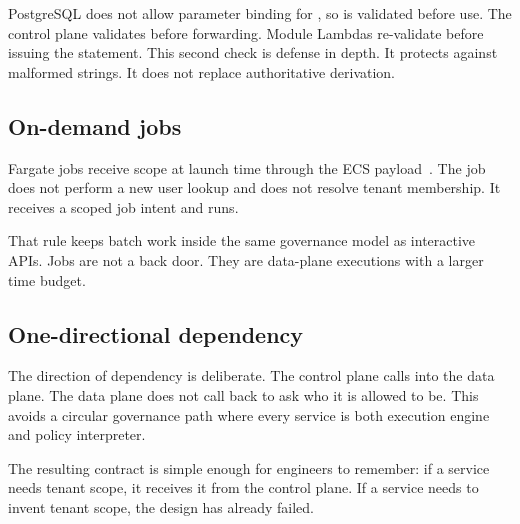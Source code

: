 PostgreSQL does not allow parameter binding for , so \scopeprefix{} is validated before use. The control plane validates before forwarding. Module Lambdas re-validate before issuing the statement. This second check is defense in depth. It protects against malformed strings. It does not replace authoritative derivation.

\subsection{On-demand jobs}

Fargate jobs receive scope at launch time through the ECS  payload~\cite{ecs_runtask}. The job does not perform a new user lookup and does not resolve tenant membership. It receives a scoped job intent and runs.

That rule keeps batch work inside the same governance model as interactive APIs. Jobs are not a back door. They are data-plane executions with a larger time budget.

\subsection{One-directional dependency}

The direction of dependency is deliberate. The control plane calls into the data plane. The data plane does not call back to ask who it is allowed to be. This avoids a circular governance path where every service is both execution engine and policy interpreter.

The resulting contract is simple enough for engineers to remember: if a service needs tenant scope, it receives it from the control plane. If a service needs to invent tenant scope, the design has already failed.
